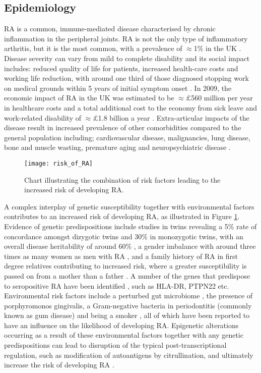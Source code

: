 \documentclass[twoside]{bhamthesis}
\theoremstyle{definition}
\begin{document}
\subsection{Epidemiology}

RA is a common, immune-mediated disease characterised by chronic inflammation in the peripheral joints. RA is not the only type of inflammatory arthritis, but it is the most common, with a prevalence of $\approx$1\% in the UK \cite{suresh2004diagnosis}. Disease severity can vary from mild to complete disability and its social impact includes: reduced quality of life for patients, increased health-care costs and working life reduction, with around one third of those diagnosed stopping work on medical grounds within 5 years of initial symptom onset \cite{barrett2000impact}. In 2009, the economic impact of RA in the UK was estimated to be $\approx\pounds$560 million per year in healthcare costs and a total additional cost to the economy from sick leave and work-related disability of $\approx\pounds$1.8 billion a year \cite{national2009services}. Extra-articular impacts of the disease result in increased prevalence of other comorbidities compared to the general population including; cardiovascular disease, malignancies, lung disease, bone and muscle wasting, premature aging and neuropsychiatric disease \cite{van2016challenging,turesson2003extra}.

\begin{figure}[!ht]
\centering\texttt{[image: risk\_of\_RA]}
\caption{Chart illustrating the combination of risk factors leading to the increased risk of developing RA.}
\label{fig:risk_of_RA}
\end{figure}

A complex interplay of genetic susceptibility together with environmental factors contributes to an increased risk of developing RA, as illustrated in Figure \ref{fig:risk_of_RA}. Evidence of genetic predispositions include studies in twins revealing a 5\% rate of concordance amongst dizygotic twins and 30\% in monozygotic twins, with an overall disease heritability of around 60\% \cite{macgregor2000characterizing}, a gender imbalance with around three times as many women as men with RA \cite{van2009sex}, and a family history of RA in first degree relatives contributing to increased risk, where a greater susceptibility is passed on from a mother than a father \cite{koumantaki1997family}. A number of the genes that predispose to seropositive RA have been identified \cite{kim2017update}, such as HLA-DR, PTPN22 etc. Environmental risk factors include a perturbed gut microbiome \cite{zhang2015oral}, the presence of porphyromonos gingivalis, a Gram-negative bacteria in periodontitis (commonly known as gum disease) \cite{mikuls2014periodontitis} and being a smoker \cite{klareskog2006new}, all of which have been reported to have an influence on the likelihood of developing RA. Epigenetic alterations occurring as a result of these environmental factors together with any genetic predispositions can lead to disruption of the typical post-transcriptional regulation, such as modification of autoantigens by citrullination, and ultimately increase the risk of developing RA \cite{mcinnes2011pathogenesis}.
\end{document}
